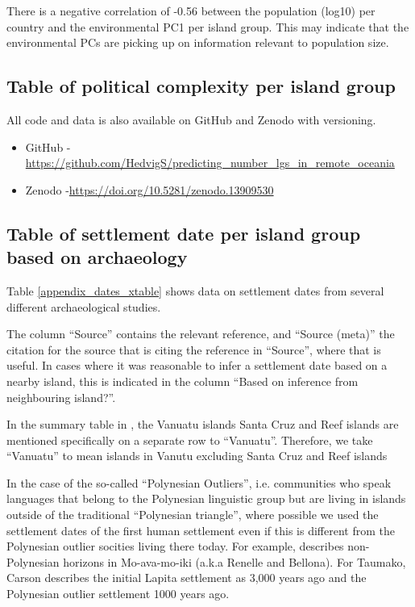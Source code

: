 \documentclass[unnumsec,webpdf,modern,medium]{oup-authoring-template}
\begin{document}
There is a negative correlation of -0.56 between the population (log10) per country and the environmental PC1 per island group. This may indicate that the environmental PCs are picking up on information relevant to population size.

\FloatBarrier
\newpage

\subsection{Table of political complexity per island group }
\singlespacing
All code and data is also available on GitHub and Zenodo with versioning.

\begin{itemize}
    \item GitHub - \url{https://github.com/HedvigS/predicting_number_lgs_in_remote_oceania}
    \item Zenodo -\url{https://doi.org/10.5281/zenodo.13909530}
\end{itemize}

 \begin{landscape}
     
\label{appendix_pol_complex}


 \end{landscape}

\newpage

\subsection{Table of settlement date per island group based on archaeology}
\singlespacing
\label{appendix_dates_table_appendix}
Table \ref{appendix_dates_xtable} shows data on settlement dates from several different archaeological studies. 

The column ``Source'' contains the relevant reference, and ``Source (meta)'' the citation for the source that is citing the reference in ``Source'', where that is useful. In cases where it was reasonable to infer a settlement date based on a nearby island, this is indicated in the column ``Based on inference from neighbouring island?''.

In the summary table in \citet{rieth_cochrane_2018},  the Vanuatu islands Santa Cruz and Reef islands are mentioned specifically on a separate row to ``Vanuatu''. Therefore, we take ``Vanuatu'' to mean islands in Vanutu excluding Santa Cruz and Reef islands 

In the case of the so-called ``Polynesian Outliers'', i.e. communities who speak languages that belong to the Polynesian linguistic group but are living in islands outside of the traditional ``Polynesian triangle'', where possible we used the settlement dates of the first human settlement even if this is different from the Polynesian outlier socities living there today. For example, \citet{carson2012recent} describes non-Polynesian horizons in Mo-ava-mo-iki (a.k.a Renelle and Bellona). For Taumako, Carson describes the initial Lapita settlement as 3,000 years ago and the Polynesian outlier settlement 1000 years ago.
\end{document}

